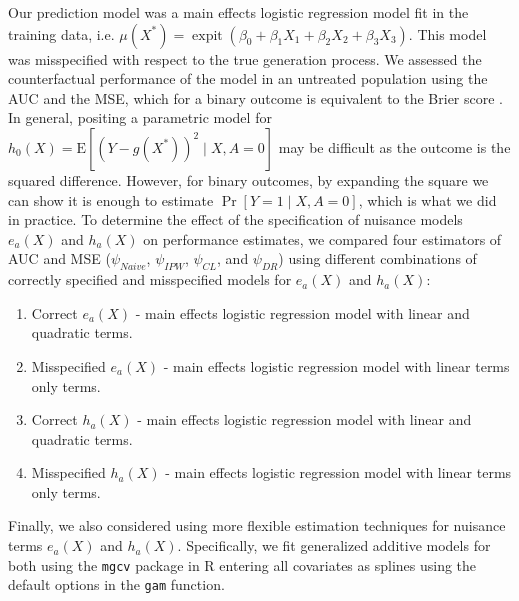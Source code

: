 Our prediction model was a main effects logistic regression model fit in the training data, i.e. $\mu\left(X^*\right) = \operatorname{expit}(\beta_0 + \beta_1 X_1 + \beta_2 X_2 + \beta_3 X_3)$. This model was misspecified with respect to the true generation process. We assessed the counterfactual performance of the model in an untreated population using the AUC and the MSE, which for a binary outcome is equivalent to the Brier score \cite{brier_verification_1950}. In general, positing a parametric model for $h_0(X)=\mathrm{E}[(Y-g\left(X^*\right))^2 \mid X, A=0]$ may be difficult as the outcome is the squared difference. However, for binary outcomes, by expanding the square we can show it is enough to estimate $\operatorname{Pr}[Y=1 \mid X, A=0]$, which is what we did in practice. To determine the effect of the specification of nuisance models $e_a(X)$ and $h_a(X)$ on performance estimates, we compared four estimators of AUC and MSE (${\psi}_{Naive}$, ${\psi}_{IPW}$, ${\psi}_{CL}$, and ${\psi}_{DR}$) using different combinations of correctly specified and misspecified models for $e_a(X)$ and $h_a(X)$:
\begin{enumerate}
    \item Correct $e_a(X)$ - main effects logistic regression model with linear and quadratic terms.
    \item Misspecified $e_a(X)$ - main effects logistic regression model with linear terms only terms.
    \item Correct $h_a(X)$ - main effects logistic regression model with linear and quadratic terms.
    \item Misspecified $h_a(X)$ - main effects logistic regression model with linear terms only terms.
\end{enumerate}
Finally, we also considered using more flexible estimation techniques for nuisance terms $e_a(X)$ and $h_a(X)$. Specifically, we fit generalized additive models for both using the \texttt{mgcv} package in $\mathrm{R}$ entering all covariates as splines using the default options in the \texttt{gam} function.

